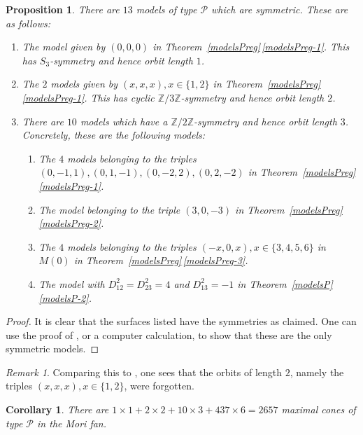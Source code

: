 \documentclass[11pt]{amsart}
\numberwithin{equation}{section}
\theoremstyle{plain}
\newtheorem{proposition}[theorem]{Proposition}
\newtheorem{corollary}[theorem]{Corollary}
\theoremstyle{remark}
\newtheorem{remark}[theorem]{Remark}
\newcommand{\Z}{{\mathbb Z}}
\begin{document}
\begin{proposition}
\label{por::symmetricmodelsP}
There are $13$ models of type $\mathscr{P}$ which are symmetric. These are as follows: 
\begin{enumerate}
\item The model given by $(0,0,0)$ in Theorem~\ref{modelsPreg}\,\eqref{modelsPreg-1}. This has $S_3$-symmetry and hence orbit length $1$.
\item The $2$ models given by $(x,x,x), x \in \{1,2\}$ in Theorem~\ref{modelsPreg}\,\eqref{modelsPreg-1}. This has cyclic $\Z/3\Z$-symmetry and hence orbit length $2$. 
\item%
  There are $10$ models which have a $\Z/2 \Z$-symmetry and hence orbit length $3$. Concretely, these are the following models: 
\begin{enumerate}
\item The $4$ models belonging to the triples $(0,-1,1), (0,1,-1), (0,-2,2), (0,2,-2)$ in Theorem~\ref{modelsPreg}\,\eqref{modelsPreg-1}.
\item The model belonging to the triple $(3,0,-3)$ in Theorem~\ref{modelsPreg}\,\eqref{modelsPreg-2}.
\item The $4$ models belonging to the triples $(-x,0,x), x \in \{3,4,5,6 \}$ in $M(0)$ in Theorem~\ref{modelsPreg}\,\eqref{modelsPreg-3}.
\item The model with $D_{12}^2=D_{23}^2=4$ and $D_{13}^2=-1$ in Theorem~\ref{modelsP}\,\eqref{modelsP-2}. 
\end{enumerate}
\end{enumerate}
\end{proposition}

\begin{proof}
It is clear that the surfaces listed have the symmetries as claimed. One can use the proof of \cite[Theorem 7.14]{HL22}, or a computer calculation, to show that these are the only symmetric models.
\end{proof}

\begin{remark}
Comparing this to \cite[Theorem 7.14]{HL22}, one sees that the orbits of length $2$, namely the triples $(x,x,x), x \in \{1,2\}$, were forgotten.
\end{remark}

\begin{corollary}
\label{cor:maximalconesPP}
There are $1 \times 1 + 2 \times 2 + 10 \times 3 + 437 \times 6= 2657$ maximal cones of type $\mathscr{P}$ in the Mori fan.
\end{corollary}
\end{document}
